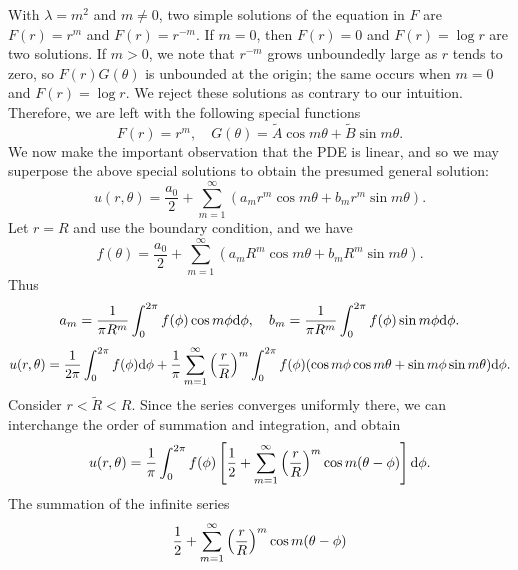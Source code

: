\begin{sol}
  With $\lambda=m^2$ and $m\neq 0$,
  two simple solutions of the equation in $F$ are $F(r)=r^m$ and $F(r)=r^{-m}$.
  If $m=0$, then $F(r)=0$ and $F(r)=\log r$ are two solutions.
  If $m>0$,
  we note that $r^{-m}$ grows unboundedly large as $r$ tends to zero,
  so $F(r)G(\theta)$ is unbounded at the origin; the same occurs when $m=0$
  and $F(r)=\log r$.
  We reject these solutions as contrary to our intuition.
  Therefore,
  we are left with the following special functions
  \begin{displaymath}
    F(r) = r^m, \quad G(\theta) = \tilde{A}\cos m\theta + \tilde{B}\sin m\theta.
  \end{displaymath}
  We now make the important observation that the PDE is linear,
  and so we may superpose the above special solutions to obtain the
  presumed general solution:
  \begin{displaymath}
    u(r, \theta) = \frac{a_0}{2} + \sum_{m=1}^{\infty}(a_mr^m\cos m\theta +
    b_m r^m\sin m\theta).
  \end{displaymath}
  Let $r=R$ and use the boundary condition, and we have
  \begin{displaymath}
    f(\theta) = \frac{a_0}{2} + \sum_{m=1}^{\infty}(a_mR^m\cos m\theta + b_mR^m\sin m\theta).
  \end{displaymath}
  Thus
  \begin{displaymath}
    a_m = \frac{1}{\pi R^m}\int_0^{2\pi}f(\phi)\cos m\phi\mathrm{d} \phi, \quad
    b_m = \frac{1}{\pi R^m}\int_0^{2\pi}f(\phi)\sin m\phi\mathrm{d} \phi.
  \end{displaymath}
  \begin{align*}
    u(r, \theta) = \frac{1}{2\pi}\int_0^{2\pi}f(\phi)\mathrm{d} \phi
    + \frac{1}{\pi}\sum_{m=1}^{\infty}\left( \frac{r}{R}\right)^m
    \int_0^{2\pi}f(\phi)(\cos m\phi\cos m\theta + \sin m\phi\sin m\theta)\mathrm{d} \phi.
  \end{align*}
  Consider $r<\tilde{R}<R$.
  Since the series converges uniformly there,
  we can interchange the order of summation and integration,
  and obtain
  \begin{equation}
    \label{eq:7}
    u(r, \theta) = \frac{1}{\pi}\int_0^{2\pi}f(\phi)\left[ \frac{1}{2} +
    \sum_{m=1}^{\infty}\left( \frac{r}{R}\right)^m\cos m(\theta-\phi)\right]\mathrm{d}\phi.
\end{equation}
The summation of the infinite series
\begin{displaymath}
  \frac{1}{2} + \sum_{m=1}^{\infty}\left( \frac{r}{R}\right)^m\cos m(\theta-\phi)
\end{displaymath}

\end{sol}
